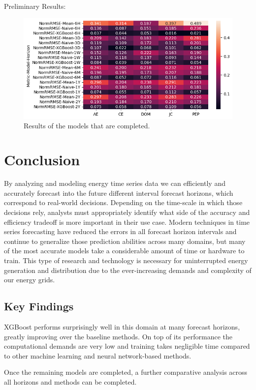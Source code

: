 \documentclass[sigconf]{acmart}
\begin{document}
Preliminary Results:
  \begin{figure}[hbt!]
    \includegraphics[width=\columnwidth]{Images/Prelim_Results.png}
    \caption{Results of the models that are completed.}
    \Description{}
    \label{fig:results}
  \end{figure}

\section{Conclusion}
By analyzing and modeling energy time series data we can efficiently and accurately forecast into the future different interval forecast horizons, which correspond to real-world decisions. Depending on the time-scale in which those decisions rely, analysts must appropriately identify what side of the accuracy and efficiency tradeoff is more important in their use case. Modern techniques in time series forecasting have reduced the errors in all forecast horizon intervals and continue to generalize those prediction abilities across many domains, but many of the most accurate models take a considerable amount of time or hardware to train. This type of research and technology is necessary for uninterrupted energy generation and distribution due to the ever-increasing demands and complexity of our energy grids.

\subsection{Key Findings}
XGBoost performs surprisingly well in this domain at many forecast horizons, greatly improving over the baseline methods. On top of its performance the computational demands are very low and training takes negligible time compared to other machine learning and neural network-based methods.

Once the remaining models are completed, a further comparative analysis across all horizons and methods can be completed.
\end{document}
